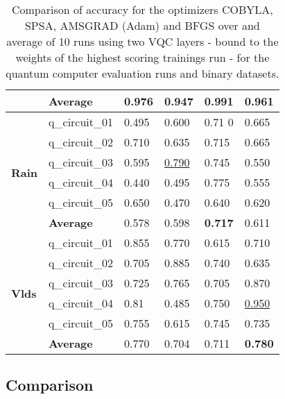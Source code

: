 \begin{table}[!h]
\begin{tabular}{p{}p{}|p{}p{}p{}p{}}
		\cline{2-6} 
		                        & \textbf{Average} & 0.976  & 0.947 & \textbf{0.991}    & 0.961 \\
		\hline 
		\multirow{6}{*}{\textbf{Rain}}   & q\_circuit\_01 & 0.495  & 0.600 & 0.71 0  & 0.665 \\
		                        & q\_circuit\_02 & 0.710  & 0.635 & 0.715    & 0.665 \\
		                        & q\_circuit\_03 & 0.595  & \underline{0.790} & 0.745    & 0.550 \\
		                        & q\_circuit\_04 & 0.440  & 0.495 & 0.775    & 0.555 \\
		                        & q\_circuit\_05 & 0.650  & 0.470 & 0.640   & 0.620 \\
		\cline{2-6} 
		                        & \textbf{Average} & 0.578  & 0.598 & \textbf{0.717}    & 0.611 \\
		\hline 
		\multirow{6}{*}{\textbf{Vlds}}   & q\_circuit\_01 & 0.855  & 0.770 & 0.615    & 0.710 \\
		                        & q\_circuit\_02 & 0.705  & 0.885 & 0.740    & 0.635 \\
		                        & q\_circuit\_03 & 0.725  & 0.765 & 0.705    & 0.870 \\
		                        & q\_circuit\_04 & 0.81  & 0.485 & 0.750    & \underline{0.950} \\
		                        & q\_circuit\_05 & 0.755  & 0.615 & 0.745    & 0.735 \\
		\cline{2-6} 
		                        & \textbf{Average} & 0.770  & 0.704 & 0.711    & \textbf{0.780} \\
		\hline
	\end{tabular}
	\caption{Comparison of accuracy for the optimizers COBYLA, SPSA, AMSGRAD (Adam) and BFGS over and average of 10 runs using two VQC layers - bound to the weights of the highest scoring trainings run - for the quantum computer evaluation runs and binary datasets.}
	\label{table:accuracy_comparison_binary_dataset_and_optimizers_evaluation_runs}
\end{table}

\subsection{Comparison}

